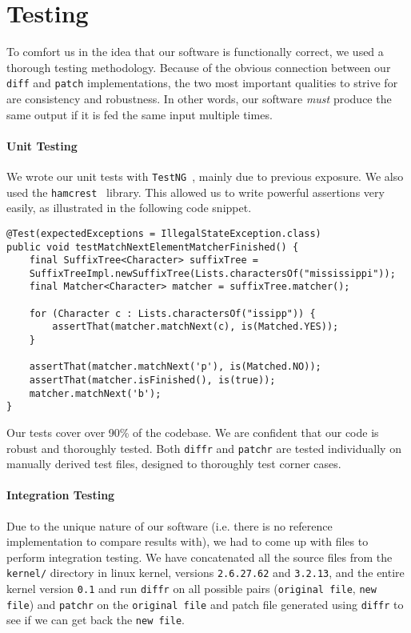 \section{Testing}
\label{Testing}

To comfort us in the idea that our software is functionally correct, we used a thorough testing methodology. Because of the obvious connection between our \texttt{diff} and \texttt{patch} implementations, the two most important qualities to strive for are consistency and robustness. In other words, our software \textit{must} produce the same output if it is fed the same input multiple times.

\paragraph{Unit Testing}
We wrote our unit tests with \texttt{TestNG}~\cite{testng}, mainly due to previous exposure. We also used the \texttt{hamcrest}~\cite{hamcrest} library. This allowed us to write powerful assertions very easily, as illustrated in the following code snippet.

\begin{lstlisting}[caption={\texttt{diffr.suffixtree.impl.MatcherImplTest}}]
@Test(expectedExceptions = IllegalStateException.class)
public void testMatchNextElementMatcherFinished() {
    final SuffixTree<Character> suffixTree = 
    SuffixTreeImpl.newSuffixTree(Lists.charactersOf("mississippi"));
    final Matcher<Character> matcher = suffixTree.matcher();

    for (Character c : Lists.charactersOf("issipp")) {
        assertThat(matcher.matchNext(c), is(Matched.YES));
    }

    assertThat(matcher.matchNext('p'), is(Matched.NO));
    assertThat(matcher.isFinished(), is(true));
    matcher.matchNext('b');
}
\end{lstlisting}

Our tests cover over 90\% of the codebase. We are confident that our code is robust and thoroughly tested. Both \texttt{diffr} and \texttt{patchr} are tested individually on manually derived test files, designed to thoroughly test corner cases.

\paragraph{Integration Testing}
\label{IntegrationTesting}
Due to the unique nature of our software (i.e. there is no reference implementation to compare results with), we had to come up with files to perform integration testing. We have concatenated all the source files from the \texttt{kernel/} directory in linux kernel, versions \texttt{2.6.27.62} and \texttt{3.2.13}, and the entire kernel version \texttt{0.1} and run \texttt{diffr} on all possible pairs (\texttt{original file}, \texttt{new file}) and \texttt{patchr} on the \texttt{original file} and patch file generated using \texttt{diffr} to see if we can get back the \texttt{new file}.     

